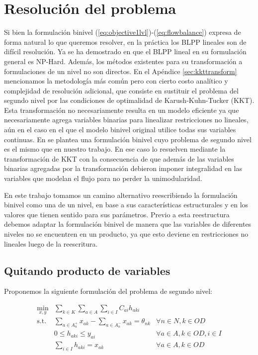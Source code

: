 \chapter{Resolución del problema}
\label{sect:problemresolution}

Si bien la formulación binivel (\ref{eq:objective1lvl})-(\ref{eq:flowbalance}) expresa de forma natural lo que queremos resolver, en la práctica los BLPP lineales son de difícil resolución. Ya se ha demostrado en \textcite{bardbook} que el BLPP lineal en su formulación general es NP-Hard. Además, los métodos existentes para su transformación a formulaciones de un nivel no son directos. En el Apéndice \ref{sec:kkttransform} mencionamos la metodología más común pero con cierto costo analítico y complejidad de resolución adicional, que consiste en sustituir el problema del segundo nivel por las condiciones de optimalidad de Karush-Kuhn-Tucker (KKT). Esta transformación no necesariamente resulta en un modelo eficiente ya que necesariamente agrega variables binarias para linealizar restricciones no lineales, aún en el caso en el que el modelo binivel original utilice todas sus variables continuas. En \textcite{kara2004} se plantea una formulación binivel cuyo problema de segundo nivel es el mismo que en nuestro trabajo. En ese caso lo resuelven mediante la transformación de KKT con la consecuencia de que además de las variables binarias agregadas por la transformación debieron imponer integralidad en las variables que modelan el flujo para no perder la unimodularidad.

En este trabajo tomamos un camino alternativo reescribiendo la formulación binivel como una de un nivel, en base a sus características estructurales y en los valores que tienen sentido para sus parámetros. Previo a esta reestructura debemos adaptar la formulación binivel de manera que las variables de diferentes niveles no se encuentren en un producto, ya que esto deviene en restricciones no lineales luego de la reescritura.

\section{Quitando producto de variables}
\label{sect:variableproductremoval}

Proponemos la siguiente formulación del problema de segundo nivel:

\begin{align}
  \min_{x,y} & \sum_{k \in K} \sum_{a \in A} \sum_{i \in I} C_{ai} h_{aki}          & \label{eq:subproblemrefeq1} \\
  \text{s.t.} & \sum_{a \in A_n^+} x_{ak} - \sum_{a \in A_n^-} x_{ak} = \theta_{nk} & \forall n \in N, k \in OD \\
              & 0 \leq h_{aki} \leq y_{ai}                                          & \forall a \in A, k \in OD, i \in I \\
              & \sum_{i \in I} h_{aki} = x_{ak}                                     & \forall a \in A, k \in OD \label{eq:subproblemrefeq4}
\end{align}

